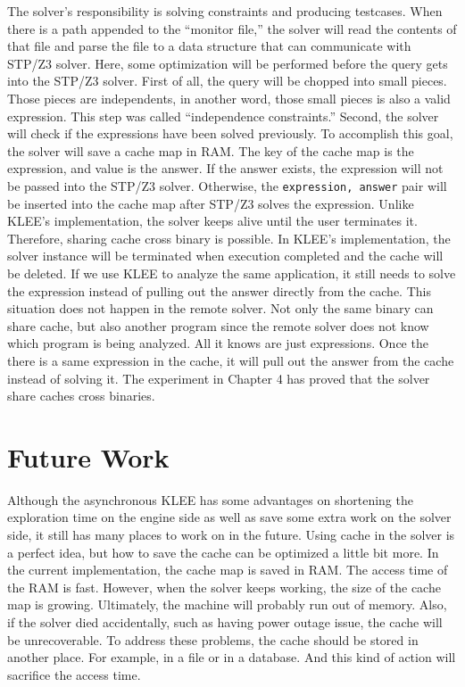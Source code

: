 The solver's responsibility is solving constraints and producing testcases. When there is a path appended to the ``monitor file,'' the solver will read the contents of that file and parse the file to a data structure that can communicate with STP/Z3 solver. Here, some optimization will be performed before the query gets into the STP/Z3 solver. First of all, the query will be chopped into small pieces. Those pieces are independents, in another word, those small pieces is also a valid expression. This step was called ``independence constraints.'' Second, the solver will check if the expressions have been solved previously. To accomplish this goal, the solver will save a cache map in RAM. The key of the cache map is the expression, and value is the answer. If the answer exists, the expression will not be passed into the STP/Z3 solver. Otherwise, the \texttt{expression, answer} pair will be inserted into the cache map after STP/Z3 solves the expression. Unlike KLEE's implementation, the solver keeps alive until the user terminates it. Therefore, sharing cache cross binary is possible. In KLEE's implementation, the solver instance will be terminated when execution completed and the cache will be deleted. If we use KLEE to analyze the same application, it still needs to solve the expression instead of pulling out the answer directly from the cache. This situation does not happen in the remote solver. Not only the same binary can share cache, but also another program since the remote solver does not know which program is being analyzed. All it knows are just expressions. Once the there is a same expression in the cache, it will pull out the answer from the cache instead of solving it. The experiment in Chapter 4 has proved that the solver share caches cross binaries.

\section{Future Work}
Although the asynchronous KLEE has some advantages on shortening the exploration time on the engine side as well as save some extra work on the solver side, it still has many places to work on in the future. Using cache in the solver is a perfect idea, but how to save the cache can be optimized a little bit more. In the current implementation, the cache map is saved in RAM. The access time of the RAM is fast. However, when the solver keeps working, the size of the cache map is growing. Ultimately, the machine will probably run out of memory. Also, if the solver died accidentally, such as having power outage issue, the cache will be unrecoverable. To address these problems, the cache should be stored in another place. For example, in a file or in a database. And this kind of action will sacrifice the access time. 